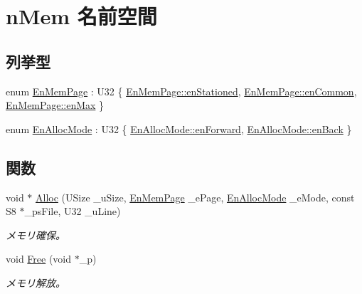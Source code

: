 \hypertarget{namespacen_mem}{}\section{n\+Mem 名前空間}
\label{namespacen_mem}
\subsection*{列挙型}
\begin{DoxyCompactItemize}
\item 
enum \hyperlink{namespacen_mem_a44d64d91225ba6c957054d2db885dfbe}{En\+Mem\+Page} \+: U32 \{ \hyperlink{namespacen_mem_a44d64d91225ba6c957054d2db885dfbea6a1b8649038aeb0a85ce63e897cea82f}{En\+Mem\+Page\+::en\+Stationed}, 
\hyperlink{namespacen_mem_a44d64d91225ba6c957054d2db885dfbeabe9fa21614b3e6b1262058b536d50965}{En\+Mem\+Page\+::en\+Common}, 
\hyperlink{namespacen_mem_a44d64d91225ba6c957054d2db885dfbea079bb6413c37006b9fdc56add34e517b}{En\+Mem\+Page\+::en\+Max}
 \}
\item 
enum \hyperlink{namespacen_mem_aae5f274bd5d48f77be9c3142a1e83e8b}{En\+Alloc\+Mode} \+: U32 \{ \hyperlink{namespacen_mem_aae5f274bd5d48f77be9c3142a1e83e8ba51de7c871812c0d91929b2fa407db09f}{En\+Alloc\+Mode\+::en\+Forward}, 
\hyperlink{namespacen_mem_aae5f274bd5d48f77be9c3142a1e83e8ba3b7d737dc6a726f089f8d85df120a77f}{En\+Alloc\+Mode\+::en\+Back}
 \}
\end{DoxyCompactItemize}
\subsection*{関数}
\begin{DoxyCompactItemize}
\item 
void $\ast$ \hyperlink{namespacen_mem_acb65bac5ab61012cdbde0ecce3e51d18}{Alloc} (U\+Size \+\_\+u\+Size, \hyperlink{namespacen_mem_a44d64d91225ba6c957054d2db885dfbe}{En\+Mem\+Page} \+\_\+e\+Page, \hyperlink{namespacen_mem_aae5f274bd5d48f77be9c3142a1e83e8b}{En\+Alloc\+Mode} \+\_\+e\+Mode, const S8 $\ast$\+\_\+ps\+File, U32 \+\_\+u\+Line)
\begin{DoxyCompactList}\small\item\em メモリ確保。 \end{DoxyCompactList}\item 
void \hyperlink{namespacen_mem_a9aaa87b3f418d881912df1c3acab0764}{Free} (void $\ast$\+\_\+p)
\begin{DoxyCompactList}\small\item\em メモリ解放。 \end{DoxyCompactList}\end{DoxyCompactItemize}


